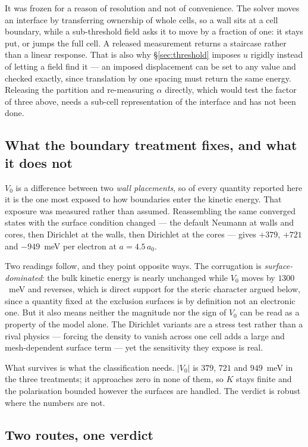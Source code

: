 \documentclass[11pt]{article}
\begin{document}
It was frozen for a reason of resolution and not of convenience. The solver moves an interface by
transferring ownership of whole cells, so a wall sits at a cell boundary, while a sub-threshold field
asks it to move by a fraction of one: it stays put, or jumps the full cell. A released measurement
returns a staircase rather than a linear response. That is also why \S\ref{sec:threshold} imposes
$u$ rigidly instead of letting a field find it --- an imposed displacement can be set to any value
and checked exactly, since translation by one spacing must return the same energy. Releasing the
partition and re-measuring $\alpha$ directly, which would test the factor of three above, needs a
sub-cell representation of the interface and has not been done.

\subsection{What the boundary treatment fixes, and what it does not}

$V_0$ is a difference between two \emph{wall placements}, so of every quantity reported here it is
the one most exposed to how boundaries enter the kinetic energy. That exposure was measured rather
than assumed. Reassembling the same converged states with the surface condition changed --- the
default Neumann at walls and cores, then Dirichlet at the walls, then Dirichlet at the cores ---
gives $+379$, $+721$ and $-949$~meV per electron at $a=4.5\,a_0$.

Two readings follow, and they point opposite ways. The corrugation is \emph{surface-dominated}: the
bulk kinetic energy is nearly unchanged while $V_0$ moves by $1300$~meV and reverses, which is
direct support for the steric character argued below, since a quantity fixed at the exclusion
surfaces is by definition not an electronic one. But it also means neither the magnitude nor the
sign of $V_0$ can be read as a property of the model alone. The Dirichlet variants are a stress
test rather than a rival physics --- forcing the density to vanish across one cell adds a large and
mesh-dependent surface term --- yet the sensitivity they expose is real.

What survives is what the classification needs. $|V_0|$ is $379$, $721$ and $949$~meV in the three
treatments; it approaches zero in none of them, so $K$ stays finite and the polarisation bounded
however the surfaces are handled. The verdict is robust where the numbers are not.

\subsection{Two routes, one verdict}
\end{document}
